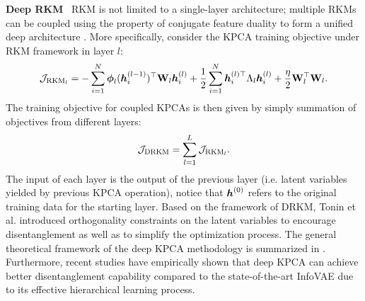 \noindent\textbf{Deep RKM} \ RKM is not limited to a single-layer architecture; multiple RKMs can be coupled using the property of conjugate feature duality to form a unified deep architecture \cite{suykensDeepRestrictedKernel2017}. More specifically, consider the KPCA training objective under RKM framework in layer $l$:
\begin{equation}
    \mathcal{J}_{\text{RKM}_l} = -\sum_{i=1}^{N} \boldsymbol{\phi}_{l}(\boldsymbol{h}_i^{(l-1)})^\top \mathbf{W}_{l} \boldsymbol{h}_i^{(l)} + \frac{1}{2} \sum_{i=1}^{N} \boldsymbol{h}_i^{(l)\top} \Lambda_{l} \boldsymbol{h}_i^{(l)} + \frac{\eta}{2} \mathbf{W}_{l}^\top \mathbf{W}_{l}.
\end{equation}
The training objective for coupled KPCAs is then given by simply summation of objectives from different layers:
\begin{equation}
    \mathcal{J}_{\text{DRKM}} = \sum_{l=1}^{L} \mathcal{J}_{\text{RKM}_l}.
\end{equation}
The input of each layer is the output of the previous layer (i.e. latent variables yielded by previous KPCA operation), notice that $\boldsymbol{h}^{(0)}$ refers to the original training data for the starting layer. Based on the framework of DRKM, Tonin et al. \cite{toninUnsupervisedLearningDisentangled2021} introduced orthogonality constraints on the latent variables to encourage disentanglement as well as to simplify the optimization process. The general theoretical framework of the deep KPCA methodology is summarized in \cite{toninDeepKernelPrincipal2024}. Furthermore, recent studies \cite{toninDeepKernelPrincipal2024} have empirically shown that deep KPCA can achieve better disentanglement capability compared to the state-of-the-art InfoVAE \cite{zhaoInfoVAEBalancingLearning2019} due to its effective hierarchical learning process.

